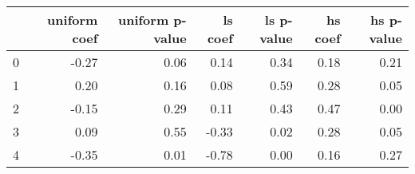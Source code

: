\begin{tabular}{lrrrrrr}
\toprule
 & uniform coef & uniform p-value & ls coef & ls p-value & hs coef & hs p-value \\
\midrule
0 & -0.27 & 0.06 & 0.14 & 0.34 & 0.18 & 0.21 \\
1 & 0.20 & 0.16 & 0.08 & 0.59 & 0.28 & 0.05 \\
2 & -0.15 & 0.29 & 0.11 & 0.43 & 0.47 & 0.00 \\
3 & 0.09 & 0.55 & -0.33 & 0.02 & 0.28 & 0.05 \\
4 & -0.35 & 0.01 & -0.78 & 0.00 & 0.16 & 0.27 \\
\bottomrule
\end{tabular}
